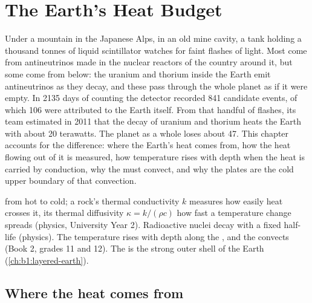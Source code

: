 \chapter{The Earth's Heat Budget}\label{ch:b1:heat-budget}

Under a mountain in the Japanese Alps, in an old mine cavity, a tank holding a
thousand tonnes of liquid scintillator watches for faint flashes of light. Most
come from antineutrinos made in the nuclear reactors of the country around it,
but some come from below: the uranium and thorium inside the Earth emit
antineutrinos as they decay, and these pass through the whole planet as if it
were empty. In 2135 days of counting the detector recorded 841 candidate
events, of which 106 were attributed to the Earth itself. From that handful of
flashes, its team estimated in 2011 that the decay of uranium and thorium heats
the Earth with about 20 terawatts. The planet as a whole loses about 47. This
chapter accounts for the difference: where the Earth's heat comes from, how
the heat flowing out of it is measured, how temperature rises with depth when
the heat is carried by conduction, why the  must convect, and why the
plates are the cold upper boundary of that convection.

\begin{recall}
 from hot to cold; a rock's thermal conductivity $k$ measures how
easily heat crosses it, its thermal diffusivity $\kappa = k/(\rho c)$ how fast a
temperature change spreads (physics, University Year 2). Radioactive nuclei
decay with a fixed half-life (physics). The temperature rises with depth along
the , and the  convects (Book 2, grades 11 and 12). The
 is the strong outer shell of the Earth (\cref{ch:b1:layered-earth}).
\end{recall}

\section{Where the heat comes from}

